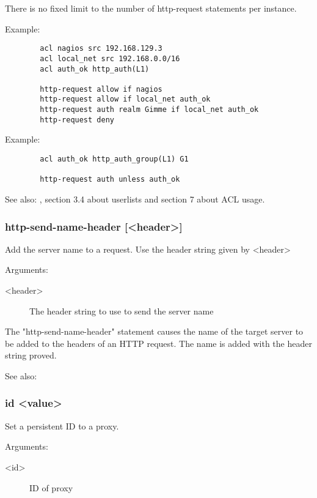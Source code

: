   There is no fixed limit to the number of http-request statements per
  instance.

  Example:
  \begin{verbatim}
        acl nagios src 192.168.129.3
        acl local_net src 192.168.0.0/16
        acl auth_ok http_auth(L1)

        http-request allow if nagios
        http-request allow if local_net auth_ok
        http-request auth realm Gimme if local_net auth_ok
        http-request deny
    \end{verbatim}

  Example:
\begin{verbatim}
        acl auth_ok http_auth_group(L1) G1

        http-request auth unless auth_ok
\end{verbatim}

  See also: , section 3.4 about userlists and section 7
             about ACL usage.

\subsubsection[http-send-name-header]{http-send-name-header [<header>]}
  Add the server name to a request. Use the header string given by <header>


  Arguments:
  
\begin{description}
\item[ <header>]  The header string to use to send the server name
\end{description}

  The "http-send-name-header" statement causes the name of the target
  server to be added to the headers of an HTTP request.  The name
  is added with the header string proved.

  See also: 

\subsubsection[id]{id <value>}
  Set a persistent ID to a proxy.
  
  
  Arguments:
\begin{description}
\item[<id>] ID of proxy 
\end{description}

